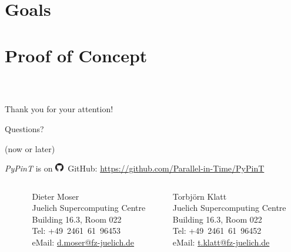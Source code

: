\documentclass[%
  english,
  hyperref={pdfpagelabels=false},
  aspectratio=1610]{beamer}
\begin{document}
\part{Goals}
\makepart


\part{Proof of Concept}
\makepart


\begin{frame}
  \frametitle{~}
  \begin{center}
    {\huge Thank you for your attention!}\par
    \bigskip
    \bigskip
    \bigskip
    {\Large Questions?}\par
    {\scriptsize\color{fzjgray50}(now or later)}\par
    \bigskip
    {\scriptsize \emph{PyPinT} is on \includegraphics[height=1em]{GitHub-Mark-32px.png}~GitHub: \url{https://github.com/Parallel-in-Time/PyPinT}}
    \bigskip
    \begin{columns}
      \tiny
      \begin{column}{0.09\textwidth}
      \end{column}
      \begin{column}{0.3\textwidth}
        Dieter Moser\\
        Juelich Supercomputing Centre\\
        Building 16.3, Room 022\\
        Tel: +49~2461~61~96453\\
        eMail: \href{mailto:d.moser@fz-juelich.de}{d.moser@fz-juelich.de}
      \end{column}
      \begin{column}{0.3\textwidth}
        Torbjörn Klatt\\
        Juelich Supercomputing Centre\\
        Building 16.3, Room 022\\
        Tel: +49~2461~61~96452\\
        eMail: \href{mailto:t.klatt@fz-juelich.de}{t.klatt@fz-juelich.de}
      \end{column}

\end{columns}
\end{center}
\end{frame}
\end{document}
